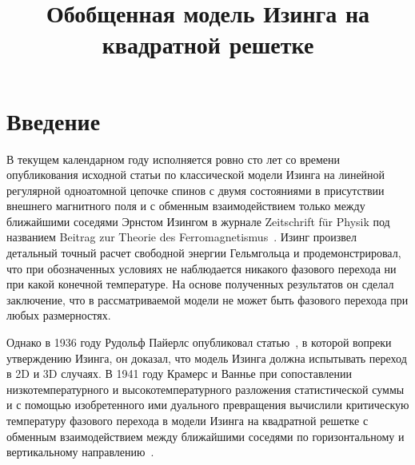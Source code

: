 \documentclass[utf8,12pt]{jetp}
\begin{document}
\title{Обобщенная модель Изинга на квадратной решетке}
	
	
	

	
	
	
	
\maketitle

\section{Введение}

В текущем календарном году исполняется ровно сто лет со времени опубликования исходной статьи по классической модели Изинга на линейной регулярной одноатомной цепочке спинов с двумя состояниями в присутствии внешнего магнитного поля и с обменным взаимодействием только между ближайшими соседями Эрнстом Изингом в журнале Zeitschrift für Physik под названием Beitrag zur Theorie des Ferromagnetismus~\cite{ising1925}. Изинг произвел детальный точный расчет свободной энергии Гельмгольца и продемонстрировал, что при обозначенных условиях не наблюдается никакого фазового перехода ни при какой конечной температуре. На основе полученных результатов он сделал заключение, что в рассматриваемой модели не может быть фазового перехода при любых размерностях.

Однако в 1936 году Рудольф Пайерлс опубликовал статью~\cite{peierls1936}, в которой вопреки утверждению Изинга, он доказал, что модель Изинга должна испытывать переход в 2D и 3D случаях. В 1941 году Крамерс и Ваннье при сопоставлении низкотемпературного и высокотемпературного разложения статистической суммы и с помощью изобретенного ими дуального превращения вычислили критическую температуру фазового перехода в модели Изинга на квадратной решетке с обменным взаимодействием между ближайшими соседями по горизонтальному и вертикальному направлению~\cite{kramers_wannier1, kramers_wannier2}.
\end{document}
